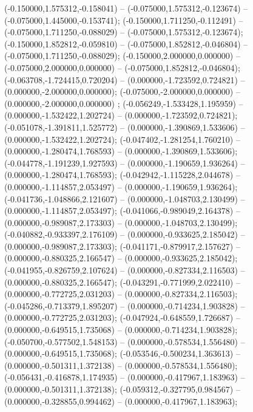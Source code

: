  (-0.150000,1.575312,-0.158041) -- (-0.075000,1.575312,-0.123674) -- (-0.075000,1.445000,-0.153741);
 (-0.150000,1.711250,-0.112491) -- (-0.075000,1.711250,-0.088029) -- (-0.075000,1.575312,-0.123674);
 (-0.150000,1.852812,-0.059810) -- (-0.075000,1.852812,-0.046804) -- (-0.075000,1.711250,-0.088029);
 (-0.150000,2.000000,0.000000) -- (-0.075000,2.000000,0.000000) -- (-0.075000,1.852812,-0.046804);
 (-0.063708,-1.724415,0.720204) -- (0.000000,-1.723592,0.724821) -- (0.000000,-2.000000,0.000000);
 (-0.075000,-2.000000,0.000000) -- (0.000000,-2.000000,0.000000) ;
 (-0.056249,-1.533428,1.195959) -- (0.000000,-1.532422,1.202724) -- (0.000000,-1.723592,0.724821);
 (-0.051078,-1.391811,1.525772) -- (0.000000,-1.390869,1.533606) -- (0.000000,-1.532422,1.202724);
 (-0.047402,-1.281254,1.760210) -- (0.000000,-1.280474,1.768593) -- (0.000000,-1.390869,1.533606);
 (-0.044778,-1.191239,1.927593) -- (0.000000,-1.190659,1.936264) -- (0.000000,-1.280474,1.768593);
 (-0.042942,-1.115228,2.044678) -- (0.000000,-1.114857,2.053497) -- (0.000000,-1.190659,1.936264);
 (-0.041736,-1.048866,2.121607) -- (0.000000,-1.048703,2.130499) -- (0.000000,-1.114857,2.053497);
 (-0.041066,-0.989049,2.164378) -- (0.000000,-0.989087,2.173303) -- (0.000000,-1.048703,2.130499);
 (-0.040882,-0.933397,2.176109) -- (0.000000,-0.933625,2.185042) -- (0.000000,-0.989087,2.173303);
 (-0.041171,-0.879917,2.157627) -- (0.000000,-0.880325,2.166547) -- (0.000000,-0.933625,2.185042);
 (-0.041955,-0.826759,2.107624) -- (0.000000,-0.827334,2.116503) -- (0.000000,-0.880325,2.166547);
 (-0.043291,-0.771999,2.022410) -- (0.000000,-0.772725,2.031203) -- (0.000000,-0.827334,2.116503);
 (-0.045286,-0.713379,1.895207) -- (0.000000,-0.714234,1.903828) -- (0.000000,-0.772725,2.031203);
 (-0.047924,-0.648559,1.726687) -- (0.000000,-0.649515,1.735068) -- (0.000000,-0.714234,1.903828);
 (-0.050700,-0.577502,1.548153) -- (0.000000,-0.578534,1.556480) -- (0.000000,-0.649515,1.735068);
 (-0.053546,-0.500234,1.363613) -- (0.000000,-0.501311,1.372138) -- (0.000000,-0.578534,1.556480);
 (-0.056431,-0.416878,1.174935) -- (0.000000,-0.417967,1.183963) -- (0.000000,-0.501311,1.372138);
 (-0.059312,-0.327795,0.984567) -- (0.000000,-0.328855,0.994462) -- (0.000000,-0.417967,1.183963);
